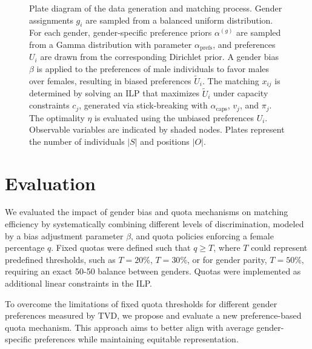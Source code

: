\documentclass[letterpaper]{article}
\begin{document}
\begin{figure}[ht]
\caption{Plate diagram of the data generation and matching process. Gender assignments \( g_i \) are sampled from a balanced uniform distribution. For each gender, gender-specific preference priors \( \alpha^{(g)} \) are sampled from a Gamma distribution with parameter \( \alpha_\mathrm{prefs} \), and preferences \( U_i \) are drawn from the corresponding Dirichlet prior. A gender bias \( \beta \) is applied to the preferences of male individuals to favor males over females, resulting in biased preferences \( \tilde{U}_i \). The matching \( x_{ij} \) is determined by solving an ILP that maximizes \( \tilde{U}_i \) under capacity constraints \( c_j \), generated via stick-breaking with \( \alpha_\mathrm{caps} \), \( v_j \), and \( \pi_j \). The optimality \( \eta \) is evaluated using the unbiased preferences \( U_i \). Observable variables are indicated by shaded nodes. Plates represent the number of individuals \( |S| \) and positions \( |O| \).}
\label{fig:plate_diagram}
\end{figure}

\section{Evaluation}

We evaluated the impact of gender bias and quota mechanisms on matching efficiency by systematically combining different levels of discrimination, modeled by a bias adjustment parameter \( \beta \), and quota policies enforcing a female percentage \(q\). Fixed quotas were defined such that \( q \geq T \), where \( T \) could represent predefined thresholds, such as \( T = 20\%\), \( T = 30\%\), or for gender parity, \( T = 50\%\), requiring an exact 50-50 balance between genders. Quotas were implemented as additional linear constraints in the ILP. 

To overcome the limitations of fixed quota thresholds for different gender preferences measured by TVD, we propose and evaluate a new preference-based quota mechanism. This approach aims to better align with average gender-specific preferences while maintaining equitable representation.
\end{document}
